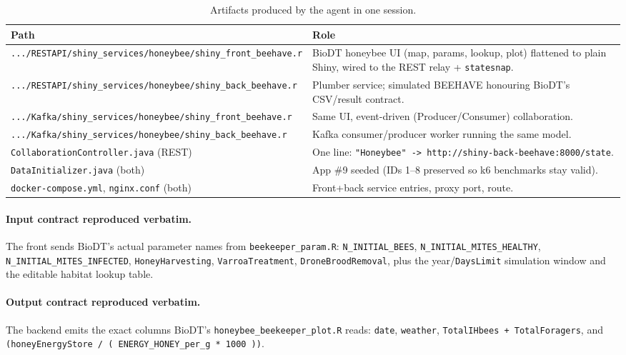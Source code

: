 \documentclass[12pt,a4paper]{article}
\begin{document}
\begin{table}[h]
\centering\small
\begin{tabular}{@{}lp{8.6cm}@{}}
\toprule
\textbf{Path} & \textbf{Role} \\
\midrule
\texttt{.../RESTAPI/shiny\_services/honeybee/shiny\_front\_beehave.r} &
  BioDT honeybee UI (map, params, lookup, plot) flattened to plain Shiny,
  wired to the REST relay + \texttt{statesnap}. \\
\texttt{.../RESTAPI/shiny\_services/honeybee/shiny\_back\_beehave.r} &
  Plumber service; simulated BEEHAVE honouring BioDT's CSV/result contract. \\
\texttt{.../Kafka/shiny\_services/honeybee/shiny\_front\_beehave.r} &
  Same UI, event-driven (Producer/Consumer) collaboration. \\
\texttt{.../Kafka/shiny\_services/honeybee/shiny\_back\_beehave.r} &
  Kafka consumer/producer worker running the same model. \\
\texttt{CollaborationController.java} (REST) &
  One line: \texttt{"Honeybee" -> http://shiny-back-beehave:8000/state}. \\
\texttt{DataInitializer.java} (both) &
  App \#9 seeded (IDs 1--8 preserved so k6 benchmarks stay valid). \\
\texttt{docker-compose.yml}, \texttt{nginx.conf} (both) &
  Front+back service entries, proxy port, route. \\
\bottomrule
\end{tabular}
\caption{Artifacts produced by the agent in one session.}
\end{table}

\paragraph{Input contract reproduced verbatim.} The front sends BioDT's actual
parameter names from \texttt{beekeeper\_param.R}:
\texttt{N\_INITIAL\_BEES}, \texttt{N\_INITIAL\_MITES\_HEALTHY},
\texttt{N\_INITIAL\_MITES\_INFECTED}, \texttt{HoneyHarvesting},
\texttt{VarroaTreatment}, \texttt{DroneBroodRemoval}, plus the
year/\texttt{DaysLimit} simulation window and the editable habitat lookup table.

\paragraph{Output contract reproduced verbatim.} The backend emits the exact
columns BioDT's \texttt{honeybee\_beekeeper\_plot.R} reads:
\texttt{date}, \texttt{weather},
\texttt{TotalIHbees + TotalForagers}, and
\texttt{(honeyEnergyStore / ( ENERGY\_HONEY\_per\_g * 1000 ))}.
\end{document}
